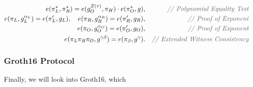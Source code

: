 \documentclass[../lecture-notes.tex]{subfiles}
\begin{document}
\begin{tcolorbox}
\begin{itemize}[label=]
    \end{itemize}
    \begin{align*}
        e(\pi_L^*, \pi_R^*) = e(g_O^{Z(\tau)}, \pi_H)\cdot e(\pi_O^*, g),&& \textcolor{gray!80!black}{\textit{// Polynomial Equality Test}} \\
        e(\pi_L, g_L^{\alpha_L}) = e(\pi_L', g_L), \quad e(\pi_R, g_R^{\alpha_R}) = e(\pi_R', g_R),&& \textcolor{gray!80!black}{\textit{// Proof of Exponent}} \\
        e(\pi_O, g_O^{\alpha_O}) = e(\pi_O', g_O),&& \textcolor{gray!80!black}{\textit{// Proof of Exponent}} \\
        e(\pi_L\pi_R\pi_O, g^{\gamma\beta}) = e(\pi_{\beta}, g^{\gamma}).&& \textcolor{gray!80!black}{\textit{// Extended Witness Consistency}}
    \end{align*}
\end{tcolorbox}

\subsubsection{Groth16 Protocol}

Finally, we will look into Groth16, which 
\end{document}
